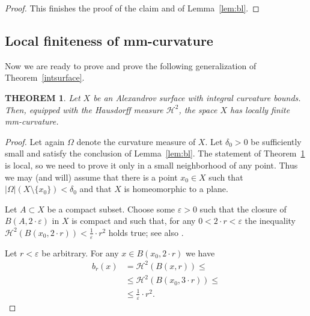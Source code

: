 \documentclass[12pt,leqno,intlimits]{amsart}
\numberwithin{equation}{section}
\newtheorem{thm}{THEOREM}[section]
\theoremstyle{definition}
\theoremstyle{remark}
\newcommand{\tref}[1]{Theorem~\ref{#1}}
\newcommand{\lref}[1]{Lemma~\ref{#1}}
\begin{document}
\begin{proof}
This finishes the proof of the claim and of \lref{lem:bl}.
\end{proof}

\subsection{Local finiteness of mm-curvature}
Now we are ready to prove and prove the following generalization of \tref{intsurface}.

\begin{thm}\label{intsurface1}
Let $X$ be an Alexandrov surface with integral curvature bounds. Then, equipped with the Hausdorff measure $\mathcal H^2$, the space $X$ has locally finite mm-curvature.
\end{thm}
%
\begin{proof}
Let again $\Omega$ denote the curvature measure of $X$. Let $\delta _0>0$ be sufficiently small and satisfy the conclusion of \lref{lem:bl}.
The statement of \tref{intsurface1} is local, so we need to prove it only in a small neighborhood of any point.
Thus we may (and will) assume that there is a point $x_0\in X$
such that $| \Omega| (X \setminus \{ x_0 \}) < \delta _0$ and that $X$ is homeomorphic to a plane.

Let $A\subset X$ be a compact subset. Choose some $\varepsilon >0$ such that the closure of $B (A,{2{\cdot}\varepsilon})$ in $X$ is compact and such that,
for any $0<2{\cdot}r<\varepsilon$ the inequality $\mathcal H^2 (B(x_0,{2{\cdot}r})) < \tfrac 1 {\varepsilon}\cdot r^2$ holds true; see also \cite[Lemma 8.1.1]{Reshetnyak-GeomIV}.

Let $r<\varepsilon$ be arbitrary.
For any $x\in B (x_0,{2{\cdot}r})$ we have
\begin{align*}
b_r (x) &=\mathcal H^2 (B (x,r)) \leq
\\
&\leq \mathcal H^2 (B (x_0,{3{\cdot}r})) \leq
\\
&\leq \tfrac 1 {\varepsilon}\cdot r^2.
\end{align*}



\end{proof}
\end{document}
